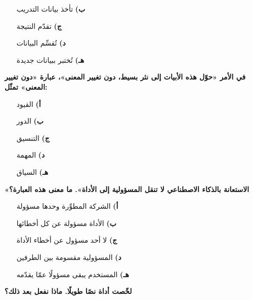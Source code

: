 \documentclass[11pt,a4paper]{article}
\begin{document}
\begin{multicols}{2}
\begin{minipage}{\linewidth}
\begin{itemize}[leftmargin=0.95cm, labelsep=4pt, itemsep=0pt, topsep=2pt, parsep=0pt]
  \item[\textbf{ب)}] تأخذ بيانات التدريب
  \item[\textbf{ج)}] تقدّم النتيجة
  \item[\textbf{د)}] تُقسِّم البيانات
  \item[\textbf{هـ)}] تُختبر ببيانات جديدة
\end{itemize}
\end{minipage}\par\vspace{7pt plus 4pt}
\noindent\begin{minipage}{\linewidth}
\hangindent=0.7cm\textbf{في الأمر «حوّل هذه الأبيات إلى نثر بسيط، دون تغيير المعنى»، عبارة «دون تغيير المعنى» تمثّل:}
\begin{itemize}[leftmargin=0.95cm, labelsep=4pt, itemsep=0pt, topsep=2pt, parsep=0pt]
  \item[\textbf{أ)}] القيود
  \item[\textbf{ب)}] الدور
  \item[\textbf{ج)}] التنسيق
  \item[\textbf{د)}] المهمة
  \item[\textbf{هـ)}] السياق
\end{itemize}
\end{minipage}\par\vspace{7pt plus 4pt}
\noindent\begin{minipage}{\linewidth}
\hangindent=0.7cm\textbf{«الاستعانة بالذكاء الاصطناعي لا تنقل المسؤولية إلى الأداة». ما معنى هذه العبارة؟}
\begin{itemize}[leftmargin=0.95cm, labelsep=4pt, itemsep=0pt, topsep=2pt, parsep=0pt]
  \item[\textbf{أ)}] الشركة المطوِّرة وحدها مسؤولة
  \item[\textbf{ب)}] الأداة مسؤولة عن كل أخطائها
  \item[\textbf{ج)}] لا أحد مسؤول عن أخطاء الأداة
  \item[\textbf{د)}] المسؤولية مقسومة بين الطرفين
  \item[\textbf{هـ)}] المستخدم يبقى مسؤولًا عمّا يقدّمه
\end{itemize}
\end{minipage}\par\vspace{7pt plus 4pt}
\noindent\begin{minipage}{\linewidth}
\hangindent=0.7cm\textbf{لخّصت أداة نصًا طويلًا. ماذا نفعل بعد ذلك؟}

\end{minipage}
\end{multicols}
\end{document}

